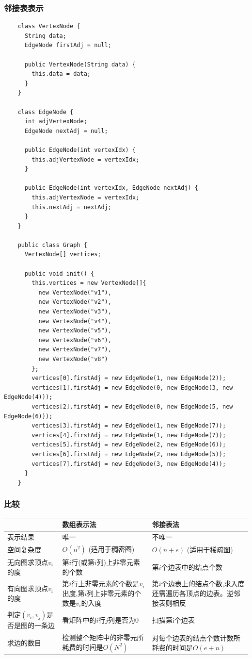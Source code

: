 \begin{frame}
  \frametitle{邻接表表示}
  \begin{verbatim}
    class VertexNode {
      String data;
      EdgeNode firstAdj = null;

      public VertexNode(String data) {
        this.data = data;
      }
    }

    class EdgeNode {
      int adjVertexNode;
      EdgeNode nextAdj = null;

      public EdgeNode(int vertexIdx) {
        this.adjVertexNode = vertexIdx;
      }

      public EdgeNode(int vertexIdx, EdgeNode nextAdj) {
        this.adjVertexNode = vertexIdx;
        this.nextAdj = nextAdj;
      }
    }
    
    public class Graph {
      VertexNode[] vertices;

      public void init() {
        this.vertices = new VertexNode[]{
          new VertexNode("v1"),
          new VertexNode("v2"),
          new VertexNode("v3"),
          new VertexNode("v4"),
          new VertexNode("v5"),
          new VertexNode("v6"),
          new VertexNode("v7"),
          new VertexNode("v8")
        };
        vertices[0].firstAdj = new EdgeNode(1, new EdgeNode(2));
        vertices[1].firstAdj = new EdgeNode(0, new EdgeNode(3, new EdgeNode(4)));
        vertices[2].firstAdj = new EdgeNode(0, new EdgeNode(5, new EdgeNode(6)));
        vertices[3].firstAdj = new EdgeNode(1, new EdgeNode(7));
        vertices[4].firstAdj = new EdgeNode(1, new EdgeNode(7));
        vertices[5].firstAdj = new EdgeNode(2, new EdgeNode(6));
        vertices[6].firstAdj = new EdgeNode(2, new EdgeNode(5));
        vertices[7].firstAdj = new EdgeNode(3, new EdgeNode(4));
      }
    }
  \end{verbatim}
\end{frame}

\begin{frame}[fragile]
  \frametitle{比较}
  \small
  \begin{tabular}{| p{2cm} | p{4cm} | p{4cm} |}
    \hline
    ~ & 数组表示法 & 邻接表法 \\ \hline
    表示结果 & 唯一 & 不唯一 \\ \hline
    空间复杂度 & $O(n^2)$ (适用于稠密图) & $O(n+e)$ (适用于稀疏图) \\ \hline
    无向图求顶点$v_i$的度 & 第$i$行(或第$i$列)上非零元素的个数 & 第$i$个边表中的结点个数 \\ \hline
    有向图求顶点$v_i$的度  & 第$i$行上非零元素的个数是$v_i$出度,第$i$列上非零元素的个数是$v_i$的入度 & 第$i$个边表上的结点个数,求入度还需遍历各顶点的边表。逆邻接表则相反\\ \hline
    判定$(v_i, v_j)$是否是图的一条边 &  看矩阵中的$i$行$j$列是否为0 & 扫描第i个边表 \\ \hline
    求边的数目 & 检测整个矩阵中的非零元所耗费的时间是$O(N^2)$ & 对每个边表的结点个数计数所耗费的时间是$O(e+n)$ \\ \hline
  \end{tabular}  
\end{frame}

